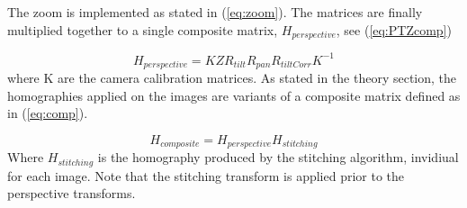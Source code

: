 	The zoom is implemented as stated in (\ref{eq:zoom}).
	The matrices are finally multiplied together to a single composite matrix, $H_{perspective}$, see (\ref{eq:PTZcomp})

	\begin{equation}
		H_{perspective}=KZR_{tilt}R_{pan}R_{tiltCorr}K^{-1}
		\label{eq:PTZcomp}
	\end{equation}
	where K are the camera calibration matrices.
	As stated in the theory section, the homographies applied on the images are variants of a composite matrix defined as in (\ref{eq:comp}).

	\begin{equation}
		H_{composite}=H_{perspective}H_{stitching}
		\label{eq:comp}
	\end{equation}
	Where $H_{stitching}$ is the homography produced by the stitching algorithm, invidiual for each image. Note that the stitching transform is applied prior to the perspective transforms. %
